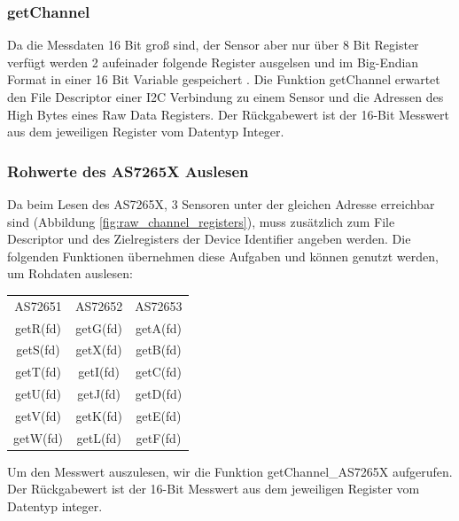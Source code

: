 \subsubsection{getChannel}
Da die Messdaten 16 Bit groß sind, der Sensor aber nur über 8 Bit Register verfügt werden 2 aufeinader folgende Register ausgelsen und im Big-Endian Format in einer 16 Bit Variable gespeichert .
Die Funktion getChannel erwartet den File Descriptor einer I2C Verbindung zu einem Sensor und die Adressen des High Bytes eines Raw Data Registers.
Der Rückgabewert ist der 16-Bit Messwert aus dem jeweiligen Register vom Datentyp Integer.\\



\subsubsection{Rohwerte des AS7265X Auslesen}\label{Rohwerte-des-AS7265X-Auslesen}
Da beim Lesen des AS7265X, 3 Sensoren unter der gleichen Adresse erreichbar sind (Abbildung \ref{fig:raw_channel_registers}), muss zusätzlich zum File Descriptor und des Zielregisters der Device Identifier angeben werden.
Die folgenden Funktionen übernehmen diese Aufgaben und können genutzt werden, um Rohdaten auslesen:
\begin{center}
\begin{tabular}{ c c c }
 	AS72651 & AS72652 & AS72653 \\ 
 	getR(fd) & getG(fd) & getA(fd) \\  
 	getS(fd) & getX(fd) & getB(fd) \\
 	getT(fd) & getI(fd) & getC(fd) \\  
 	getU(fd) & getJ(fd) & getD(fd) \\
 	getV(fd) & getK(fd) & getE(fd) \\  
 	getW(fd) & getL(fd) & getF(fd) \\
\end{tabular}
\end{center}
Um den Messwert auszulesen, wir die Funktion getChannel\_AS7265X aufgerufen.\\
Der Rückgabewert ist der 16-Bit Messwert aus dem jeweiligen Register vom Datentyp integer.\\

%

